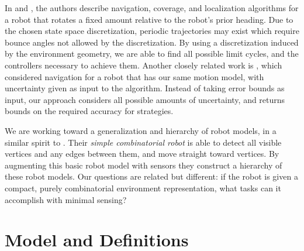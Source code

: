 \documentclass[]{styles/svproc}  %
\begin{document}
In \cite{alam2017minimalist} and \cite{alam2018space}, the authors describe
navigation, coverage, and localization algorithms for a robot that rotates a fixed amount 
relative to the robot's prior heading. Due to the chosen state space discretization, 
periodic trajectories may exist which require bounce angles not allowed by the
discretization. By using a discretization induced by the environment geometry,
we are able to find all possible limit cycles, and the controllers necessary to
achieve them.
Another closely related work is \cite{LewOKa13}, which considered
navigation for a robot that has our same motion model, with uncertainty given as input to the
algorithm. Instead of taking error bounds as input, our approach
considers all possible amounts of uncertainty, and returns bounds on the required
accuracy for strategies.

We are working toward a generalization and hierarchy of robot models, in a
similar spirit to \cite{brunner2008simple}. Their {\em simple
combinatorial robot} is able to detect all visible vertices and any edges
between them, and move straight toward vertices. By augmenting this basic robot model
with sensors they construct a hierarchy of these robot models. Our questions are related but 
different: if the robot is given a compact, purely combinatorial environment representation, 
what tasks can it accomplish with minimal sensing?



\section{Model and Definitions}
\end{document}

